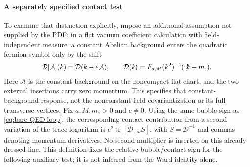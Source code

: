 \documentclass[final,5p,times,twocolumn,numbers,nopreprintline]{elsarticle}
\numberwithin{equation}{section}
\theoremstyle{definition}
\theoremstyle{remark}
\newcommand{\ii}{\mathrm i}
\newcommand{\Tr}{\operatorname{tr}}
\begin{document}
\paragraph{A separately specified contact test}
To examine that distinction explicitly, impose an additional assumption
not supplied by the PDF: in a flat vacuum coefficient calculation with
field-independent measure, a constant Abelian background enters the
quadratic fermion symbol only by the shift
\[
 \mathcal D[\mathcal A](k)=\mathcal D(k+e\mathcal A),\qquad
 \mathcal D(k)=F_{a,M}(k^2)^{-1}(\ii\slashed k+m_e).
\]
Here \(\mathcal A\) is the constant background on the noncompact flat
chart, and the two external insertions carry zero momentum. This
specifies that constant-background response, not the nonconstant-field
covariantization or its full transverse vertices. Fix \(a,M,m_e>0\) and \(e\ne0\).
Using the same bubble sign as \eqref{eq:bare-QED-loop}, the corresponding
contact contribution from a second variation of the trace logarithm is
\(e^2\Tr[\mathcal D_{,\mu\nu}S]\), with \(S=\mathcal D^{-1}\)
and commas denoting momentum derivatives. No second multiplier is
inserted on this already dressed line. This definition fixes the
relative bubble/contact sign for the following auxiliary test; it is
not inferred from the Ward identity alone.
\end{document}
